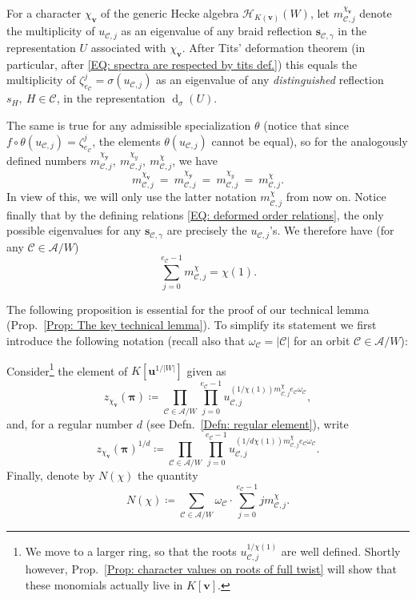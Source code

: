 \documentclass[ALCO, Unicode]{cedram}
\newcommand{\op}[1]{\operatorname{#1}}
\newcommand{\op}[1]{\operatorname{#1}}
\begin{document}
For a character $\chi_{\bm v}$ of the generic Hecke algebra $\mathcal{H}_{K(\bm v)}(W)$, let $m^{\chi_{\bm v}}_{\mathcal{C},j}$ denote the multiplicity of $u_{\mathcal{C},j}$ as an eigenvalue of any braid reflection $\bm s_{\mathcal{C},\gamma}$ in the representation $U$ associated with $\chi_{\bm v}$. After Tits' deformation theorem (in particular, after \eqref{EQ: spectra are respected by tits def.}) this equals the multiplicity of $\zeta_{e_{\mathcal{C}}}^j=\sigma (u_{\mathcal{C},j})$ as an eigenvalue of any {\it distinguished} reflection $s_H,\ H\in\mathcal{C}$, in the representation $\op{d}_{\sigma}(U)$. 

The same is true for any admissible specialization $\theta$ (notice that since $f\circ\theta (u_{\mathcal{C},j})=\zeta_{e_{\mathcal{C}}}^j$, the elements $\theta(u_{\mathcal{C},j})$ cannot be equal), so for the analogously defined numbers $m^{\chi_{\bm y}}_{\mathcal{C},j},\ m^{\chi_y}_{\mathcal{C},j},\ m^{\chi}_{\mathcal{C},j}$, we have $$  m^{\chi_{\bm v}}_{\mathcal{C},j}\ =\ m^{\chi_{\bm y}}_{\mathcal{C},j}\ =\ m^{\chi_y}_{\mathcal{C},j}\ =\ m^{\chi}_{\mathcal{C},j}.$$ In view of this, we will only use the latter notation $m^{\chi}_{\mathcal{C},j}$ from now on. Notice finally that by the defining relations \eqref{EQ: deformed order relations}, the only possible eigenvalues for any $\bm s_{\mathcal{C},\gamma}$ are precisely the $u_{\mathcal{C},j}$'s. We therefore have (for any $\mathcal{C}\in\mathcal{A}/W$) \begin{equation} \sum_{j=0}^{e_{\mathcal{C}}-1}m^{\chi}_{\mathcal{C},j}=\chi(1).\label{Eq: sum of m_H,j's=chi(1)}\end{equation} 


The following proposition is essential for the proof of our technical lemma (Prop.~\ref{Prop: The key technical lemma}). To simplify its statement we first introduce the following notation (recall also that $\omega_{\mathcal{C}}=|\mathcal{C}|$ for an orbit $\mathcal{C}\in\mathcal{A}/W$):

\begin{defi}\label{Def. Pre character value stuff}
Consider\footnote{We move to a larger ring, so that the roots $u_{\mathcal{C},j}^{1/\chi(1)}$ are well defined. Shortly however, Prop.~\ref{Prop: character values on roots of full twist} will show that these monomials actually live in $K[\bm v]$.} the element of $K[\bm u^{1/|W|}]$ given as $$z_{\chi_{\bm v}}(\bm \pi)\coloneqq \prod_{\mathcal{C}\in\mathcal{A}/W}\prod_{j=0}^{e_{\mathcal{C}}-1}u_{\mathcal{C},j}^{(1/\chi(1))m^{\chi}_{\mathcal{C},j}e_{\mathcal{C}}\omega_{\mathcal{C}}},$$ and, for a regular number $d$ \textup{(}see Defn.~\ref{Defn: regular element}\textup{)}, write $$z_{\chi_{\bm v}}(\bm \pi)^{1/d}\coloneqq \prod_{\mathcal{C}\in\mathcal{A}/W}\prod_{j=0}^{e_{\mathcal{C}}-1}u_{\mathcal{C},j}^{(1/d\chi(1))m^{\chi}_{\mathcal{C},j}e_{\mathcal{C}}\omega_{\mathcal{C}}}.$$
Finally, denote by $N(\chi)$ the quantity $$N(\chi)\coloneqq \sum_{\mathcal{C}\in\mathcal{A}/W}\omega_{\mathcal{C}}\cdot\sum_{j=0}^{e_{\mathcal{C}}-1}jm^{\chi}_{\mathcal{C},j}.$$
\end{defi}
\end{document}
